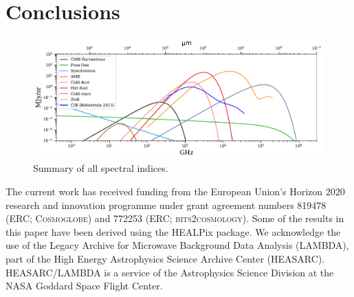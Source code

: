 \documentclass{aa}
\begin{document}
\section{Conclusions}


\begin{figure}
	\centering
	\includegraphics[width=\textwidth]{figs/all_fgs.pdf}
	\caption{Summary of all spectral indices.}
	\label{fig:SED_overview}
\end{figure}

\blindtext





\begin{acknowledgements}
 The current work has received funding from the European
  Union’s Horizon 2020 research and innovation programme under grant
  agreement numbers 819478 (ERC; \textsc{Cosmoglobe}) and 772253 (ERC;
  \textsc{bits2cosmology}). Some of the results in this paper have been derived using the HEALPix \citep{HEALPIX} package.
  We acknowledge the use of the Legacy Archive for Microwave Background Data
  Analysis (LAMBDA), part of the High Energy Astrophysics Science Archive Center
  (HEASARC). HEASARC/LAMBDA is a service of the Astrophysics Science Division at
  the NASA Goddard Space Flight Center.  
\end{acknowledgements}


%



\end{document}
